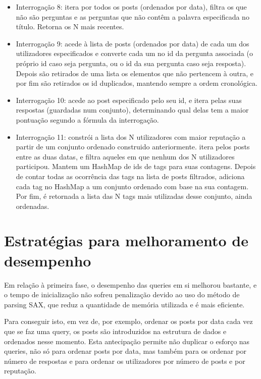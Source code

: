 \documentclass[10pt]{report}
\begin{document}
\begin{itemize}
\item Interrogação 8: itera por todos os posts (ordenados por data), filtra os que não são perguntas e as perguntas que não contêm a palavra especificada no título. Retorna os N mais recentes.

\item Interrogação 9: acede à lista de posts (ordenados por data) de cada um dos utilizadores especificados e converte cada um no id da pergunta associada (o próprio id caso seja pergunta, ou o id da sua pergunta caso seja resposta). Depois são retirados de uma lista os elementos que não pertencem à outra, e por fim são retirados os id duplicados, mantendo sempre a ordem cronológica.

\item Interrogação 10: acede ao post especificado pelo seu id, e itera pelas suas respostas (guardadas num conjunto), determinando qual delas tem a maior pontuação segundo a fórmula da interrogação.

\item Interrogação 11: constrói a lista dos N utilizadores com maior reputação a partir de um conjunto ordenado construido anteriormente. itera pelos posts entre as duas datas, e filtra aqueles em que nenhum dos N utilizadores participou. Mantem um HashMap de ids de tags para suas contagens. Depois de contar todas as ocorrência das tags na lista de posts filtrados, adiciona cada tag no HashMap a um conjunto ordenado com base na sua contagem. Por fim, é retornada a lista das N tags mais utilizadas desse conjunto, ainda ordenadas.

\end{itemize}

\section{Estratégias para melhoramento de desempenho}

Em relação à primeira fase, o desempenho das queries em si melhorou bastante, e o tempo de inicialização não sofreu penalização devido ao uso do método de parsing SAX, que reduz a quantidade de memória utilizada e é mais eficiente.

Para conseguir isto, em vez de, por exemplo, ordenar os posts por data cada vez que se faz uma query, os posts são introduzidos na estrutura de dados e ordenados nesse momento. Esta antecipação permite não duplicar o esforço nas queries, não só para ordenar posts por data, mas também para os ordenar por número de respostas e para ordenar os utilizadores por número de posts e por reputação.
\end{document}
